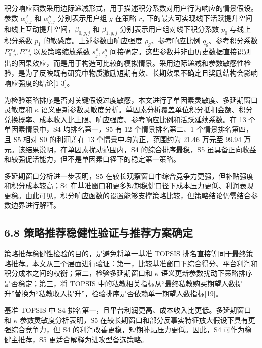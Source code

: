 \documentclass[
  12pt,
]{ctexart}
\begin{document}
积分响应函数采用边际递减形式，用于描述积分系数对用户行为响应的情景假设。参数 \(\alpha_{g,j}^{A}\) 和 \(\alpha_{g,j}^{S}\) 分别表示用户组 \(g\) 在策略 \(r_j\) 下的最大可实现线下活跃提升空间和线上互动提升空间，\(\beta_{0,g,j}\) 和 \(\beta_{1,g,j}\) 分别表示用户组对线下积分系数 \(p_0\) 与线上积分系数 \(p_1\) 的敏感度。上述参数由响应强度 \(\rho_g\)、参考响应比例 \(q_g\)、参考积分系数 \(P_{0,g}^{ref},P_{1,g}^{ref}\) 以及策略缩放系数 \(s_j^\rho,s_j^q\) 间接确定。这些参数并非由历史数据直接识别出的因果效应，而是用于构造可比较的模拟情景。采用边际递减和参数敏感性检验，是为了反映既有研究中物质激励短期有效、长期效果不确定且奖励结构会影响响应强度的结论{[}1-3{]}。

为检验策略排序是否对关键假设过度敏感，本文进行了单因素灵敏度、多延期窗口灵敏度和 \(\kappa\) 语义更新参数灵敏度分析。单因素分析覆盖单位积分抵扣金额、积分兑换概率、成本收入比上限、响应强度、参考响应比例和活跃延续系数。在 13 个单因素情景中，S4 均排名第一，S5 有 12 个情景排名第二、1 个情景排名第四，且 S5 相对 S0 的利润差在 13 个情景中均为正，范围约为 21.46 万元至 99.94 万元。该结果说明，在单因素扰动范围内，S4 的综合排序最稳，S5 虽具备正向收益和较强促活能力，但不是单因素口径下的稳定第一策略。

多延期窗口分析进一步表明，S5 在较长观察窗口中综合竞争力更强，但补贴强度和积分成本较高；S4 在基准窗口和更多短期稳健口径下成本压力更低、利润表现更稳。由此可见，积分响应函数的设置能够支撑策略比较，但策略结论仍需结合参数边界进行解释。

\hypertarget{ux7b56ux7565ux63a8ux8350ux7a33ux5065ux6027ux9a8cux8bc1ux4e0eux63a8ux8350ux65b9ux6848ux786eux5b9a}{%
\subsection{6.8 策略推荐稳健性验证与推荐方案确定}\label{ux7b56ux7565ux63a8ux8350ux7a33ux5065ux6027ux9a8cux8bc1ux4e0eux63a8ux8350ux65b9ux6848ux786eux5b9a}}

策略推荐稳健性检验的目的，是避免将单一基准 TOPSIS 排名直接等同于最终策略推荐。本文从三个层面进行验证：第一，比较基准窗口下综合得分、平台利润和积分成本之间的权衡；第二，检验多延期窗口和 \(\kappa\) 语义更新参数扰动下策略排序是否稳定；第三，将 TOPSIS 中的私教相关指标从``最终私教购买期望人数提升''替换为``私教收入提升''，检验排序是否依赖单一期望人数指标{[}19{]}。

基准 TOPSIS 中 S4 排名第一，且平台利润更高、成本收入比更低。多延期窗口和 \(\kappa\) 参数灵敏度分析表明，S5 在较长期窗口和部分反事实特征放大假设下具有更强综合竞争力，但 S4 的利润改善更稳，短期补贴压力更低。因此，S4 可作为稳健主推荐，S5 更适合解释为进攻型备选策略。
\end{document}
